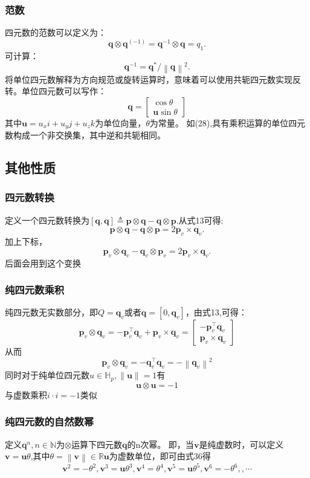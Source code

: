 \documentclass{article}
\begin{document}
\subsubsection{范数}
四元数的范数可以定义为：
$$
\textbf{q}\otimes\textbf{q}^(-1) = \textbf{q}^{-1}\otimes\textbf{q} = q_1.
$$可计算：
$$
\textbf{q}^{-1} = \textbf{q}^* / \left \| \textbf{q} \right \| ^2.
$$将单位四元数解释为方向规范或旋转运算时，意味着可以使用共轭四元数实现反转。单位四元数可以写作：
$$
\textbf{q} = \begin{bmatrix}
    \cos\theta \\
    \textbf{u}\sin\theta
\end{bmatrix}
$$其中$\textbf{u} = u_xi+u_yj+u_zk$为单位向量，$\theta$为常量。
如(28),具有乘积运算的单位四元数构成一个非交换集，其中逆和共轭相同。

\subsection{其他性质}
\subsubsection{四元数转换}
定义一个四元数转换为$\left[\textbf{q},\textbf{q}\right]\triangleq\textbf{p}
\otimes\textbf{q}-\textbf{q}\otimes\textbf{p}$.从式13可得:
$$
\textbf{p}\otimes\textbf{q}-\textbf{q}\otimes\textbf{p}=
2\textbf{p}_v\times\textbf{q}_v.
$$加上下标，
$$
\textbf{p}_v\otimes\textbf{q}_v-\textbf{q}_v\otimes\textbf{p}_v=
2\textbf{p}_v\times\textbf{q}_v.
$$后面会用到这个变换
\subsubsection{纯四元数乘积}
纯四元数无实数部分，即$Q=\textbf{q}_v$或者$\textbf{q}=\left[0,\textbf{q}_v\right]$，由式13,可得：
$$
\textbf{p}_v\otimes\textbf{q}_v = -\textbf{p}_v^{\top}\textbf{q}_v+\textbf{p}_v\times\textbf{q}_v = 
\begin{bmatrix}
    -\textbf{p}_v^{\top}\textbf{q}_v \\
    \textbf{p}_v\times\textbf{q}_v
\end{bmatrix}
$$从而
$$
\textbf{p}_v\otimes\textbf{q}_v = -\textbf{q}_v^{\top}\textbf{q}_v = -\left \|\textbf{q}_v  \right \|
 ^2$$同时对于纯单位四元数$u\in \mathbb{H}_p,\left \| \textbf{u} \right \|=1$有
 $$
 \textbf{u}\otimes\textbf{u} = -1
 $$与虚数乘积$i\cdot i=-1$类似

 \subsubsection{纯四元数的自然数幂}
 定义$\textbf{q}^n , n\in \mathbb{N}$为$\otimes$运算下四元数$\textbf{q}$的n次幂。
即，当$\textbf{v}$是纯虚数时，可以定义$\textbf{v}=\textbf{u}\theta$,其中$\theta = \left \|\textbf{v}\right \|\in \mathbb{R}$$\textbf{u}$为虚数单位，即可由式36得
$$
\textbf{v}^2=-\theta ^2,
\textbf{v}^3=\textbf{u}\theta ^3,
\textbf{v}^4=\theta ^4,
\textbf{v}^5=\textbf{u}\theta ^5,
\textbf{v}^6=-\theta ^6,
, \cdots 
$$
\end{document}
